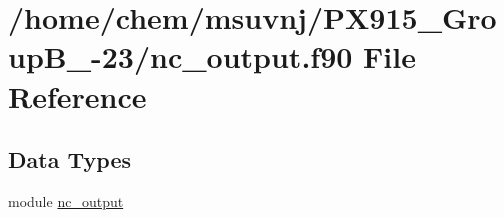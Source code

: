 \hypertarget{nc__output_8f90}{\section{/home/chem/msuvnj/\-P\-X915\-\_\-\-Group\-B\-\_-\/23/nc\-\_\-output.f90 File Reference}
\label{nc__output_8f90}
}
\subsection*{Data Types}
\begin{DoxyCompactItemize}
\item 
module \hyperlink{classnc__output}{nc\-\_\-output}
\end{DoxyCompactItemize}
